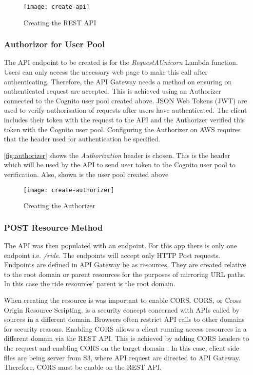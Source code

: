   \begin{figure}[H]
    \caption{Creating the REST API}
    \centering
    \texttt{[image: create-api]}
    \label{fig:rest}
  \end{figure}
  
  
  \subsubsection{Authorizor for User Pool}
  The API endpoint to be created is for the \textit{RequestAUnicorn}  Lambda function. Users can only access the necessary web page to make this call after authenticating. Therefore, the API Gateway needs a method on ensuring on authenticated request are accepted. This is achieved using an Authorizer connected to the Cognito user pool created above. JSON Web Tokens (JWT) are used to verify authorisation of requests after users have authenticated. The client includes their token with the request to the API and the Authorizer  verified this token with the Cognito user pool. Configuring the Authorizer on AWS requires that the header used for authentication be specified. 
  
  \autoref{fig:authorizer} shows the \textit{Authorization} header is chosen. This is the header which will be used by the API to send user token to the Cognito user pool to verification. Also, shown is the user pool created above 
  
  \begin{figure}[H]
    \caption{Creating the Authorizer}
    \centering
    \texttt{[image: create-authorizer]}
    \label{fig:authorizer}
  \end{figure}  

  \subsubsection{POST Resource Method}
  The API was then populated with an endpoint. For this app there is only one endpoint i.e. \textit{/ride}. The endpoints will accept only HTTP Post requests. Endpoints are defined in API Gateway be as resources. They are created relative to the root domain or parent resources for the purposes of mirroring URL paths. In this case the ride resources' parent is the root domain.
   
  When creating the resource is was important to enable CORS. CORS, or Cross Origin Resource Scripting, is a security concept concerned with APIs called by sources in a different domain. Browsers often restrict API calls to other domains for security reasons. Enabling CORS allows a client running access resources in a different domain via the REST API. This is achieved by adding CORS headers to the request and enabling CORS on the target domain \citep{mozilla}. In this case, client side files are being server from S3, where API request are directed to API Gateway. Therefore, CORS must be enable on the REST API.
  
